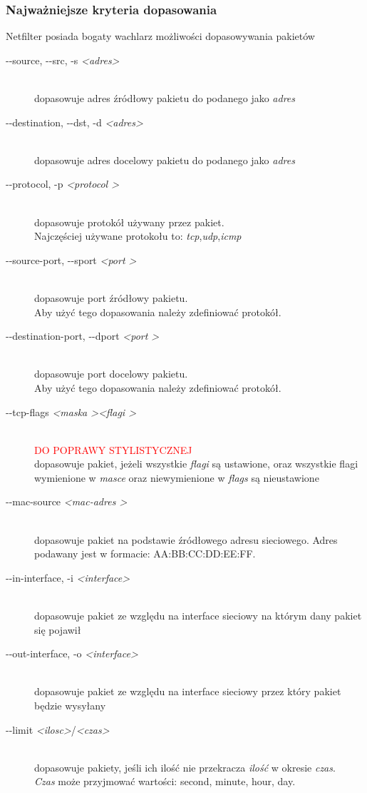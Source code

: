 \documentclass[a4paper,10pt,twoside]{book}
\newcommand{\param}[1]{\textit{\textless #1\textgreater}}
\begin{document}
			\subsubsection{Najważniejsze kryteria dopasowania}
				Netfilter posiada bogaty wachlarz możliwości dopasowywania pakietów
				\begin{description}
					\item[-{}-source, -{}-src, -s \param{adres} ] \hfill \\
						dopasowuje adres źródłowy pakietu do podanego jako \textit{adres}
					\item[-{}-destination, -{}-dst, -d \param{adres}] \hfill\\
						dopasowuje adres docelowy pakietu do podanego jako \textit{adres}
					\item[-{}-protocol, -p \textit{\textless protocol \textgreater}] \hfill \\
						dopasowuje protokół używany przez pakiet.\\
						Najczęściej używane protokołu to: \textit{tcp},\textit{udp},\textit{icmp}
					\item[-{}-source-port, -{}-sport \textit{\textless port \textgreater} ]\hfill\\
						dopasowuje port źródłowy pakietu.\\
						Aby użyć tego dopasowania należy zdefiniować protokół.
					\item[-{}-destination-port, -{}-dport \textit{\textless port \textgreater}] \hfill \\
						dopasowuje port docelowy pakietu.\\
						Aby użyć tego dopasowania należy zdefiniować protokół.
					\item[-{}-tcp-flags \textit{\textless maska \textgreater \textless flagi \textgreater}] \hfill \\
						\textcolor{red}{\Large{DO POPRAWY STYLISTYCZNEJ}}\\
						dopasowuje pakiet, jeżeli wszystkie \textit{flagi} są ustawione, oraz wszystkie flagi wymienione w \textit{masce} oraz niewymienione w \textit{flags} są nieustawione
					\item[-{}-mac-source \textit{\textless mac-adres \textgreater}] \hfill \\
						dopasowuje pakiet na podstawie źródłowego adresu sieciowego. Adres podawany jest w formacie: AA:BB:CC:DD:EE:FF.
					\item[-{}-in-interface, -i \param{interface}] \hfill \\
						dopasowuje pakiet ze względu na interface sieciowy na którym dany pakiet się pojawił	
					\item[-{}-out-interface, -o \param{interface}] \hfill \\
						dopasowuje pakiet ze względu na interface sieciowy przez który pakiet będzie wysyłany
					\item[-{}-limit \param{ilosc}/\param{czas}] \hfill \\
						dopasowuje pakiety, jeśli ich ilość nie przekracza \textit{ilość} w okresie \textit{czas}.\\
						\textit{Czas} może przyjmować wartości: second, minute, hour, day.
				\end{description}
\end{document}
